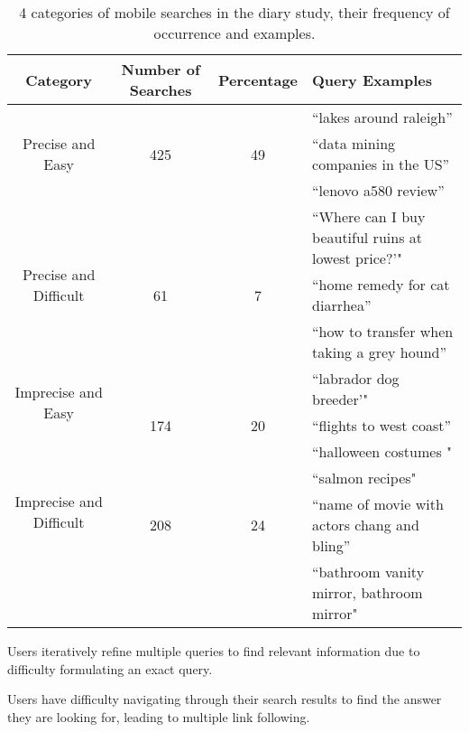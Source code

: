 \begin{table*}[ht]
\begin{center}
    \begin{tabular}{ | c | c | c | l |}
    \hline
    Category &  Number of Searches & Percentage & Query Examples \\ \hline
   \multirow{3}{*}{Precise and Easy} & & &  ``lakes around raleigh'' \\
    					   & 425 & 49 & ``data mining companies in the US''\\ 				
					   & &  &  ``lenovo a580 review''  \\ \hline 
					   
   \multirow{3}{*}{Precise and Difficult} & & & ``Where can I buy beautiful ruins at lowest price?'"\\
    					   & 61 & 7 & ``home remedy for cat diarrhea''\\ 				
					   & &  & ``how to transfer when taking a grey hound''  \\ \hline 

   \multirow{2}{*}{ Imprecise and Easy} & & & ``labrador dog breeder'"\\
    					   & 174 & 20 & ``flights to west coast''\\
					   & & & ``halloween costumes "\\ \hline 

   \multirow{2}{*}{ Imprecise and Difficult} & & & ``salmon recipes"\\
    					   & 208 & 24 & ``name of movie with actors chang and bling''\\
					   & & & ``bathroom vanity mirror, bathroom mirror"\\ \hline 

   
 \end{tabular}
\end{center}
\label{searchcategories}
\caption{4 categories of mobile searches in the diary study, their frequency of occurrence and examples.}
\end{table*}

\begin{tight_enumerate}
\item Users iteratively refine multiple queries to find relevant information due to difficulty formulating an exact query. 
\item Users have difficulty navigating through their search results to find the answer they are looking for, leading to multiple link following.
\end{tight_enumerate}

